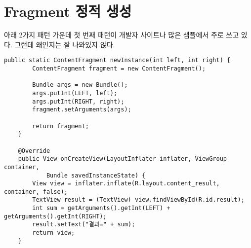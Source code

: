 \begin{comment}
경우를 좀 생각해보자.
해야 할 if  문이 10개라고 하면 10개의 boolean을 리턴하는 메서드가 필요해진다.
하위 클래스에서는 어느 것에 true이고, 어느 것에 false인지를 정해주면 되는데, 갯수가 많아지면, 나중에 정책이 바뀔 때 작업에서 혼돈이 있지 않을까.\\
 
한 가지 비유를 생각해보았다.
10권의 지정된 책이 있다. 내가 속한 조직의 구성원들한테, 각 책을 갖고 있는지 여부에 따라서 뭔가를 해주고 싶다. 책을 사준다든가, 교육을 보내준다든가 하는 게 있을 것이다.\\
 
이때 각각의 boolean 리턴 메서드를 만들 수 있다. hasEffectiveJava(), hasAndroidHacks(), ...
각 구성원 클래스는 이것을 오버라이드 해서 갖고 있는 책에다 true를 리턴하게 하면 된다.\\

그런데 어느날 책 장터가 열려서 각자 갖고 있는 책들이 다 바뀌어 버렸다.
이때 또 각각 찾아서 true/false를 바꿔주면 된다.\\
 
그런데 이런 경우에 이게 더 쉽지 않을까? 책1 가지고 있는지, 책2 가지고 있는지 계속 묻는 거 보다, 자기가 갖고 있는 책만 나열하라고 하는 것이다.
boolean 메서드를 쓰는 방식이 책 각각에 대해서 묻는 것이고, marker interface를 쓰는 건 갖고 있는 것만 나열하는 방식이다.\\
 
한두개라면  boolean 메서드 방식이 확실히 더 낫겠지만, 갯수가 막 늘어나면 한계가 보인다는 것이다.
결국 100\% 정답은 없고, 저울질을 해봐야 한다.\\
 
marker interface의 장점이 또 하나 있다. 
10권에서 한권이 늘어나도, 수정이 간단하다. 인터페이스 하나 만들고, 각 하위 클래스에다 implements 에 인터페이스 추가만 하면 된다.
아무리 IDE가 편리해 졌다지만, 메서드 생성하고 true/false 리턴하는 번거로움 보다 낫다.\\
\end{comment}

\section{Fragment 정적 생성}
아래 2가지 패턴 가운데 첫 번째 패턴이 개발자 사이트나 많은 샘플에서 주로 쓰고 있다. 그런데 왜인지는 잘 나와있지 않다.
\begin{lstlisting}[frame=single]
   public static ContentFragment newInstance(int left, int right) {
        ContentFragment fragment = new ContentFragment();

        Bundle args = new Bundle();
        args.putInt(LEFT, left);
        args.putInt(RIGHT, right);
        fragment.setArguments(args);

        return fragment;
    }

    @Override
    public View onCreateView(LayoutInflater inflater, ViewGroup container, 
    		Bundle savedInstanceState) {
        View view = inflater.inflate(R.layout.content_result, container, false);
        TextView result = (TextView) view.findViewById(R.id.result);
        int sum = getArguments().getInt(LEFT) + getArguments().getInt(RIGHT);
        result.setText("결과=" + sum);
        return view;
    }
\end{lstlisting}

